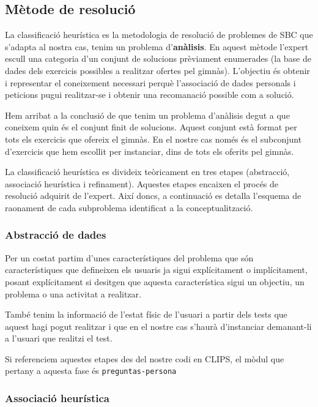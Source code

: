 \documentclass[a4paper, 12pt, UTF8]{article}
\begin{document}
\subsection{Mètode de resolució}

La classificació heurística es la metodologia de resolució de problemes de SBC que s'adapta al nostra cas, tenim un problema d'\textbf{anàlisis}. En aquest mètode l'expert escull una categoria d'un conjunt de solucions prèviament enumerades (la base de dades dels exercicis possibles a realitzar ofertes pel gimnàs). L'objectiu és obtenir i representar el coneixement necessari perquè l'associació de dades personals i peticions pugui realitzar-se i obtenir una recomanació possible com a solució.

Hem arribat a la conclusió de que tenim un problema d'anàlisis degut a que coneixem quin és el conjunt finit de solucions. Aquest conjunt està format per tots els exercicis que ofereix el gimnàs. En el nostre cas només és el subconjunt d'exercicis que hem escollit per instanciar, dins de tots els oferits pel gimnàs.

La classificació heurística es divideix teòricament en tres etapes (abstracció, associació heurística i refinament). Aquestes etapes encaixen el procés de resolució adquirit de l'expert. Així doncs, a continuació es detalla l'esquema de raonament de cada subproblema identificat a la conceptualització.

\subsubsection{Abstracció de dades}

Per un costat partim d'unes característiques del problema que són característiques que defineixen els usuaris ja sigui explícitament o implícitament, posant explícitament si desitgen que aquesta característica sigui un objectiu, un problema o una activitat a realitzar. 

També tenim la informació de l'estat físic de l'usuari a partir dels tests que aquest hagi pogut realitzar i que en el nostre cas s'haurà d'instanciar demanant-li a l'usuari que realitzi el test.

Si referenciem aquestes etapes des del nostre codi en CLIPS, el mòdul que pertany a aquesta fase és \verb|preguntas-persona|

\subsubsection{Associació heurística}
\end{document}

